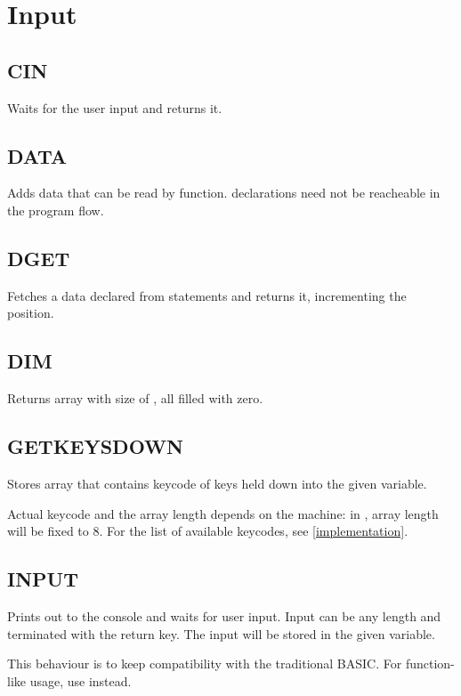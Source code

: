 \section{Input}

    \subsection{CIN}
        \par
        Waits for the user input and returns it.
    \subsection{DATA}
        \par
        Adds data that can be read by  function.  declarations need not be reacheable in the program flow.
    \subsection{DGET}
        \par
        Fetches a data declared from  statements and returns it, incrementing the  position.
    \subsection{DIM}
        \par
        Returns array with size of , all filled with zero.
    \subsection{GETKEYSDOWN}
        \par
        Stores array that contains keycode of keys held down into the given variable.\par
        Actual keycode and the array length depends on the machine: in \thismachine , array length will be fixed to 8. For the list of available keycodes, see \ref{implementation}.
    \subsection{INPUT}
        \par
        Prints out  to the console and waits for user input. Input can be any length and terminated with the return key. The input will be stored in the given variable.\par
        This behaviour is to keep compatibility with the traditional BASIC. For function-like usage, use  instead.
